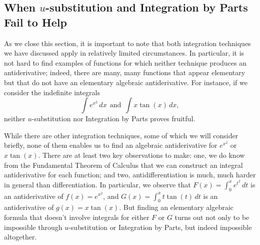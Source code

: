 \subsection*{When $u$-substitution and Integration by Parts Fail to Help}

As we close this section, it is important to note that both integration techniques we have discussed apply in relatively limited circumstances.  In particular, it is not hard to find examples of functions for which neither technique produces an antiderivative; indeed, there are many, many functions that appear elementary but that do not have an elementary algebraic antiderivative.  For instance, if we consider the indefinite integrals
$$\int e^{x^2} \, dx \ \ \mbox{and} \ \ \int x \tan(x) \, dx,$$
neither $u$-substitution nor Integration by Parts proves fruitful.  

While there are other integration techniques, some of which we will consider briefly, none of them enables us to find an algebraic antiderivative for $e^{x^2}$ or $x \tan(x)$.  There are at least two key observations to make:  one, we do know from the Fundamental Theorem of Calculus that we can construct an integral antiderivative for each function; and two, antidifferentiation is much, much harder in general than differentiation.  In particular, we observe that $F(x) = \int_0^x e^{t^2} \, dt$ is an antiderivative of $f(x) = e^{x^2}$, and $G(x) = \int_0^{x} t \tan(t) \, dt$ is an antiderivative of $g(x) = x \tan(x)$.  But finding an elementary algebraic formula that doesn't involve integrals for either $F$ or $G$ turns out not only to be impossible through $u$-substitution or Integration by Parts, but indeed impossible altogether.

\clearpage

